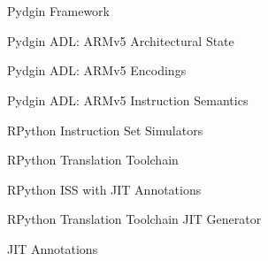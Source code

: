 
\section[{\it Presentation} Pydgin Intro]{}

\begin{frame}{Pydgin Framework}
\end{frame}

\begin{frame}{Pydgin ADL: ARMv5 Architectural State}
\end{frame}

\begin{frame}{Pydgin ADL: ARMv5 Encodings}
\end{frame}

\begin{frame}{Pydgin ADL: ARMv5 Instruction Semantics}
\end{frame}

\begin{frame}{RPython Instruction Set Simulators}
\end{frame}

\begin{frame}{RPython Translation Toolchain}
\end{frame}

\begin{frame}{RPython ISS with JIT Annotations}
\end{frame}

\begin{frame}{RPython Translation Toolchain JIT Generator}
\end{frame}

\begin{frame}{JIT Annotations}
\end{frame}

